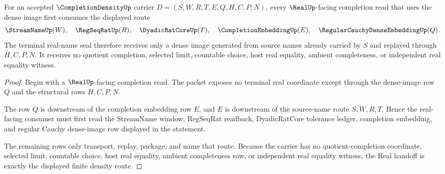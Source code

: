 \begin{theorem}
\label{thm:completion-density-real-handoff}
For an accepted $\CompletionDensityUp$ carrier $D=(S,W,R,T,E,Q,H,C,P,N)$, every $\RealUp$-facing completion read that uses the dense image first consumes the displayed route
$$
\StreamNameUp(W),\quad \RegSeqRatUp(R),\quad \DyadicRatCoreUp(T),\quad \CompletionEmbeddingUp(E),\quad \RegularCauchyDenseEmbeddingUp(Q).
$$
The terminal real-name seal therefore receives only a dense image generated from source names already carried by $S$ and replayed through $H,C,P,N$. It receives no quotient completion, selected limit, countable choice, host real equality, ambient completeness, or independent real equality witness.
\end{theorem}
\begin{proof}
Begin with a $\RealUp$-facing completion read. The packet exposes no terminal real coordinate except through the dense-image row $Q$ and the structural rows $H,C,P,N$.

The row $Q$ is downstream of the completion embedding row $E$, and $E$ is downstream of the source-name route $S,W,R,T$. Hence the real-facing consumer must first read the StreamName window, RegSeqRat readback, DyadicRatCore tolerance ledger, completion embedding, and regular Cauchy dense-image row displayed in the statement.

The remaining rows only transport, replay, package, and name that route. Because the carrier has no quotient-completion coordinate, selected limit, countable choice, host real equality, ambient completeness row, or independent real equality witness, the Real handoff is exactly the displayed finite density route.
\end{proof}


\begin{closurestatus}{\CompletionDensityUp}
  \theoryclosure{\seedClosure}
  \formalstatus{\unformalizedV}
\end{closurestatus}
